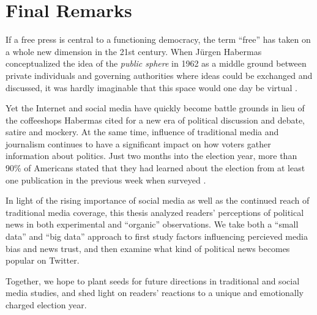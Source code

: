 \chapter{Final Remarks}
If a free press is central to a functioning democracy, the term ``free'' has taken on a whole new dimension in the 21st century. When Jürgen Habermas conceptualized the idea of the \emph{public sphere} in 1962 as a middle ground between private individuals and governing authorities where ideas could be exchanged and discussed, it was hardly imaginable that this space would one day be virtual \cite{habermas1991structural}.

Yet the Internet and social media have quickly become battle grounds in lieu of the coffeeshops Habermas cited for a new era of political discussion and debate, satire and mockery. At the same time, influence of traditional media and journalism continues to have a significant impact on how voters gather information about politics. Just two months into the election year, more than 90\% of Americans stated that they had learned about the election from at least one publication in the previous week when surveyed \cite{election-fatigue}. 

In light of the rising importance of social media as well as the continued reach of traditional media coverage, this thesis analyzed readers' perceptions of political news in both experimental and ``organic'' observations. We take both  a ``small data'' and ``big data'' approach to first study factors influencing percieved media bias and news trust, and then examine what kind of political news becomes popular on Twitter. 

Together, we hope to plant seeds for future directions in traditional and social media studies, and shed light on readers' reactions to a unique and emotionally charged election year.